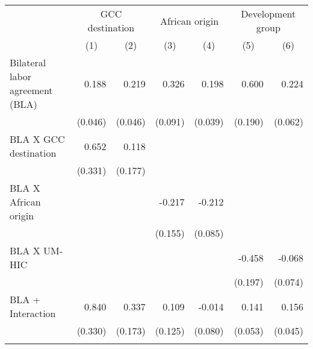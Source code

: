 \begin{tabular}{l*{6}{r}} \toprule
                    &\multicolumn{2}{c}{GCC destination}        &\multicolumn{2}{c}{African origin}         &\multicolumn{2}{c}{Development group}      \\\cmidrule(lr){2-3}\cmidrule(lr){4-5}\cmidrule(lr){6-7}
                    &\multicolumn{1}{c}{(1)}         &\multicolumn{1}{c}{(2)}         &\multicolumn{1}{c}{(3)}         &\multicolumn{1}{c}{(4)}         &\multicolumn{1}{c}{(5)}         &\multicolumn{1}{c}{(6)}         \\
\midrule
Bilateral labor agreement (BLA)&       0.188\sym{***}&       0.219\sym{***}&       0.326\sym{***}&       0.198\sym{***}&       0.600\sym{***}&       0.224\sym{***}\\
                    &     (0.046)         &     (0.046)         &     (0.091)         &     (0.039)         &     (0.190)         &     (0.062)         \\
BLA X GCC destination&       0.652\sym{**} &       0.118         &                     &                     &                     &                     \\
                    &     (0.331)         &     (0.177)         &                     &                     &                     &                     \\
BLA X African origin&                     &                     &      -0.217         &      -0.212\sym{**} &                     &                     \\
                    &                     &                     &     (0.155)         &     (0.085)         &                     &                     \\
BLA X UM-HIC        &                     &                     &                     &                     &      -0.458\sym{**} &      -0.068         \\
                    &                     &                     &                     &                     &     (0.197)         &     (0.074)         \\
\addlinespace
BLA + Interaction   &       0.840\sym{**} &       0.337\sym{*}  &       0.109         &      -0.014         &       0.141\sym{***}&       0.156\sym{***}\\
                    &     (0.330)         &     (0.173)         &     (0.125)         &     (0.080)         &     (0.053)         &     (0.045)         \\\bottomrule
\addlinespace
\addlinespace

\end{tabular}
